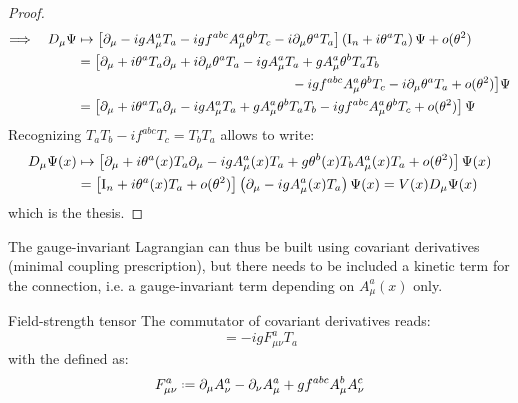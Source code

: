 \begin{proofbox}
\begin{proof}
\begin{equation*}
\begin{split}
        \Longrightarrow \quad D_\mu \Psi
        & \mapsto \left[ \partial_\mu - i g A_\mu^a T_a - i g f^{abc} A_\mu^a \theta^b T_c - i \partial_\mu \theta^a T_a \right] \left( \mathrm{I}_n + i \theta^a T_a \right) \Psi + o(\theta^2) \\
        & = \big[ \partial_\mu + i \theta^a T_a \partial_\mu + i \partial_\mu \theta^a T_a - i g A_\mu^a T_a + g A_\mu^a \theta^b T_a T_b \\
        & \qquad \qquad \qquad \qquad \qquad \qquad \qquad \qquad - i g f^{abc} A_\mu^a \theta^b T_c - i \partial_\mu \theta^a T_a + o(\theta^2) \big] \Psi \\
        & = \left[ \partial_\mu + i \theta^a T_a \partial_\mu - i g A_\mu^a T_a + g A_\mu^a \theta^b T_a T_b - i g f^{abc} A_\mu^a \theta^b T_c + o(\theta^2) \right] \Psi
      \end{split}
    \end{equation*}
    Recognizing $ T_a T_b - i f^{abc} T_c = T_b T_a $ allows to write:
    \begin{equation*}
      \begin{split}
        D_\mu \Psi(x)
        & \mapsto \left[ \partial_\mu + i \theta^a(x) T_a \partial_\mu - i g A_\mu^a(x) T_a + g \theta^b(x) T_b A_\mu^a(x) T_a + o(\theta^2) \right] \Psi(x) \\
        & = \left[ \mathrm{I}_n + i \theta^a(x) T_a + o(\theta^2) \right] \left( \partial_\mu - i g A_\mu^a(x) T_a \right) \Psi(x) = V(x) D_\mu \Psi(x)
      \end{split}
    \end{equation*}
    which is the thesis.
  \end{proof}
\end{proofbox}

The gauge-invariant Lagrangian can thus be built using covariant derivatives (minimal coupling prescription), but there needs to be included a kinetic term for the connection, i.e. a gauge-invariant term depending on $ A_\mu^a(x) $ only.

\begin{lemma}{Field-strength tensor}{}
  The commutator of covariant derivatives reads:
  \begin{equation}
    [D_\mu , D_\nu] = - i g F_{\mu \nu}^a T_a
  \end{equation}
  with the  defined as:
  \begin{equation}
    F_{\mu \nu}^a \defeq \pa_\mu A_\nu^a - \pa_\nu A_\mu^a + g f^{abc} A_\mu^b A_\nu^c
  \end{equation}
\end{lemma}

